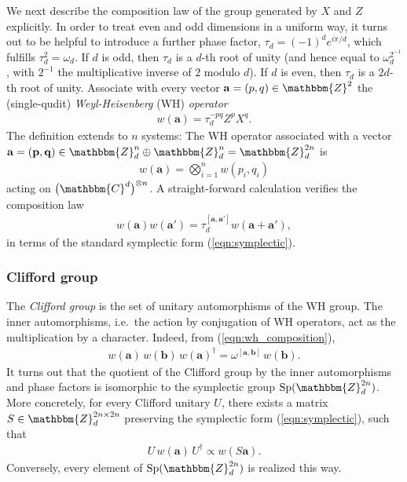 \documentclass[aps,nofootinbib,floatfix,a4paper]{revtex4}
\newcommand{\1}{\mbox{$\mathbf{1}$}}
\def\ZZ{\mathbbm{Z}}
\def\CC{\mathbbm{C}}
\DeclareMathOperator{\Sp}{Sp}
\renewcommand{\vec}{\mathbf}
\begin{document}
We next describe the composition law of the group generated by $X$ and $Z$ explicitly. 
In order to treat even and odd dimensions in a uniform way, it turns out to be helpful to introduce a further phase factor, $\tau_d=(-1)^d e^{i\pi/d}$, which fulfills $\tau_d^2=\omega_d$. 
If $d$ is odd, then $\tau_d$ is a $d$-th root of unity (and hence equal to $\omega_d^{2^{-1}}$, with $2^{-1}$ the multiplicative inverse of $2$ modulo $d$).
If $d$ is even, then $\tau_d$ is a $2d$-th root of unity.
Associate with every vector $\vec a=(p,q)\in\ZZ^2$ the (single-qudit) \emph{Weyl-Heisenberg} (WH) \emph{operator}
\begin{align*}
	w(\vec a) = \tau_d^{-pq} Z^p X^q.
\end{align*}
The definition extends to $n$ systems:
The WH operator associated with a vector $\vec a=(\vec p, \vec q)\in \ZZ_d^n\oplus\ZZ_d^n=\ZZ_d^{2n}$ is
\begin{align*}
	w(\vec a)
	=
	\bigotimes_{i=1}^n w(p_i, q_i)
\end{align*}
acting on $\big(\CC^d\big)^{\otimes n}$.
A straight-forward calculation verifies the composition law
\begin{align}\label{eqn:wh_composition}
	w(\vec a) w(\vec a') = \tau_d^{[\vec a, \vec a']} w(\vec a+ \vec a'),
\end{align}
in terms of the standard symplectic form (\ref{eqn:symplectic}).

\subsubsection{Clifford group}

The \emph{Clifford group} is the set of unitary automorphisms of the WH group.
The inner automorphisms, i.e.\ the action by conjugation of WH operators, act as the multiplication by a character.
Indeed, from (\ref{eqn:wh_composition}),
\begin{align*}
	w(\vec a) \, w(\vec b) \, w(\vec a)^\dagger = \omega^{[\vec a, \vec b]} \, w(\vec b).
\end{align*}
It turns out that the quotient of the Clifford group by the inner automorphisms and phase factors is isomorphic to the symplectic group $\Sp(\ZZ_d^{2n})$.
More concretely, for every Clifford unitary $U$,
there exists a matrix $S\in\ZZ_d^{2n\times 2n}$ preserving the symplectic form (\ref{eqn:symplectic}), such that
\begin{align*}
	U \, w(\vec a) \, U^\dagger \propto w(S \vec a).
\end{align*}
Conversely, every element of $\Sp(\ZZ_d^{2n})$ is realized this way.
\end{document}
